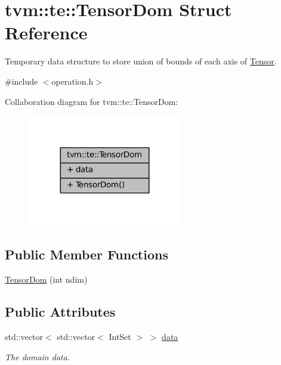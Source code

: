 \hypertarget{structtvm_1_1te_1_1TensorDom}{}\section{tvm\+:\+:te\+:\+:Tensor\+Dom Struct Reference}
\label{structtvm_1_1te_1_1TensorDom}


Temporary data structure to store union of bounds of each axis of \hyperlink{classtvm_1_1te_1_1Tensor}{Tensor}.  




{\ttfamily \#include $<$operation.\+h$>$}



Collaboration diagram for tvm\+:\+:te\+:\+:Tensor\+Dom\+:
\nopagebreak
\begin{figure}[H]
\begin{center}
\leavevmode
\includegraphics[width=191pt]{structtvm_1_1te_1_1TensorDom__coll__graph}
\end{center}
\end{figure}
\subsection*{Public Member Functions}
\begin{DoxyCompactItemize}
\item 
\hyperlink{structtvm_1_1te_1_1TensorDom_a1c1c057115d9dbeec11ff717bf18430b}{Tensor\+Dom} (int ndim)
\end{DoxyCompactItemize}
\subsection*{Public Attributes}
\begin{DoxyCompactItemize}
\item 
std\+::vector$<$ std\+::vector$<$ Int\+Set $>$ $>$ \hyperlink{structtvm_1_1te_1_1TensorDom_a9f2a41beaf5db1710238e4753ef17b85}{data}
\begin{DoxyCompactList}\small\item\em The domain data. \end{DoxyCompactList}\end{DoxyCompactItemize}


